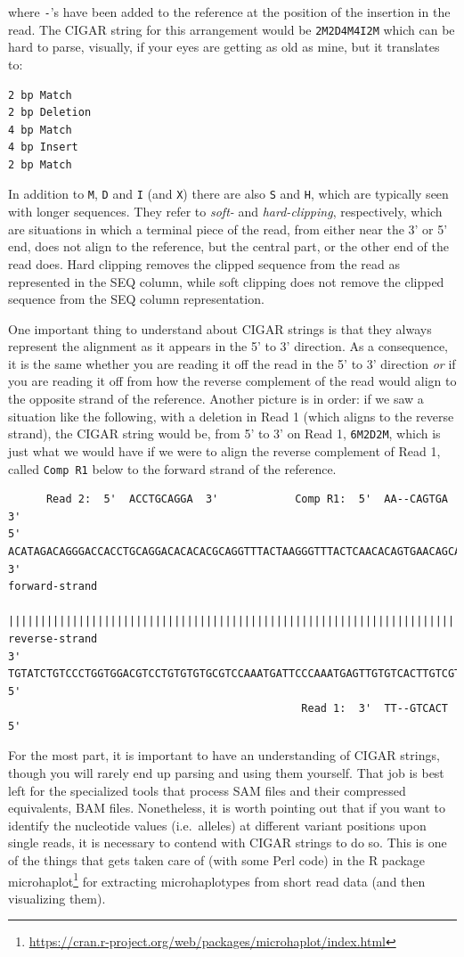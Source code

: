 \documentclass[]{krantz}
\renewcommand{\href}[2]{#2\footnote{\url{#1}}}
\begin{document}
where \texttt{-}'s have been added to the reference at the position of the insertion in the read.
The CIGAR string for this arrangement would be \texttt{2M2D4M4I2M} which can be hard to parse, visually,
if your eyes are getting as old as mine, but it translates to:

\begin{verbatim}
2 bp Match  
2 bp Deletion  
4 bp Match  
4 bp Insert   
2 bp Match   
\end{verbatim}

In addition to \texttt{M}, \texttt{D} and \texttt{I} (and \texttt{X}) there are also \texttt{S} and \texttt{H}, which are
typically seen with longer sequences. They refer to \emph{soft-} and \emph{hard-clipping},
respectively, which are situations in which a terminal piece of the read, from
either near the 3' or 5' end, does not align to the reference, but the central
part, or the other end of the read does. Hard clipping removes the clipped sequence
from the read as represented in the SEQ column, while soft clipping does not
remove the clipped sequence from the SEQ column representation.

One important thing to understand about CIGAR strings is that they always represent
the alignment as it appears in the 5' to 3' direction. As a consequence, it is the
same whether you are reading it off the read in the 5' to 3' direction \emph{or} if you are reading it
off from how the reverse complement of the read would align to the opposite strand of the reference.
Another picture is in order: if we saw a situation like the following,
with a deletion in Read 1 (which aligns to the reverse strand),
the CIGAR string would be, from 5' to 3' on Read 1, \texttt{6M2D2M},
which is just what we would have if we were to align the reverse
complement of Read 1, called \texttt{Comp\ R1} below to the forward strand
of the reference.

\begin{verbatim}
      Read 2:  5'  ACCTGCAGGA  3'            Comp R1:  5'  AA--CAGTGA  3'
5'  ACATAGACAGGGACCACCTGCAGGACACACACGCAGGTTTACTAAGGGTTTACTCAACACAGTGAACAGCATATACCAGA  3'  
forward-strand
    ||||||||||||||||||||||||||||||||||||||||||||||||||||||||||||||||||||||||||||||||
reverse-strand
3'  TGTATCTGTCCCTGGTGGACGTCCTGTGTGTGCGTCCAAATGATTCCCAAATGAGTTGTGTCACTTGTCGTATATGGTCT  5'
                                              Read 1:  3'  TT--GTCACT  5'
\end{verbatim}

For the most part, it is important to have an understanding of
CIGAR strings, though you will rarely end up parsing and using them
yourself. That job is best left for the specialized tools that process
SAM files and their compressed equivalents, BAM files. Nonetheless, it
is worth pointing out that if you want to identify the nucleotide values
(i.e.~alleles) at different variant positions upon single reads, it is necessary
to contend with CIGAR strings to do so. This is one of the things that gets
taken care of (with some Perl code) in the R package
\href{https://cran.r-project.org/web/packages/microhaplot/index.html}{microhaplot} for extracting
microhaplotypes from short read data (and then visualizing them).
\end{document}
